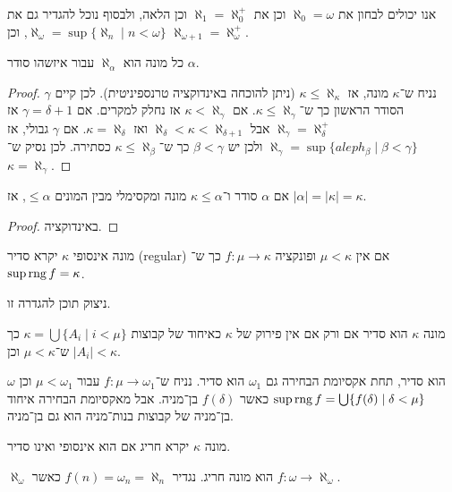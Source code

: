 אנו יכולים לבחון את $\aleph_0 = \omega$ וכן את $\aleph_1 = \aleph_0^+$ וכן הלאה, ולבסוף נוכל להגדיר גם את $\aleph_{\omega} = \sup\{ \aleph_n \mid n < \omega \}$, וכן $\aleph_{\omega + 1} = \aleph_{\omega}^+$.
\begin{theorem}
	כל מונה הוא $\aleph_{\alpha}$ עבור איזשהו סודר $\alpha$.
\end{theorem}
\begin{proof}
	נניח ש־$\kappa$ מונה, אז $\kappa \le \aleph_{\kappa}$ (ניתן להוכחה באינדוקציה טרנספיניטית).
	לכן קיים $\gamma$ הסודר הראשון כך ש־$\kappa \le \aleph_{\gamma}$.
	אם $\kappa < \aleph_{\gamma}$ אז נחלק למקרים.
	אם $\gamma = \delta + 1$ אז $\aleph_{\gamma} = \aleph_{\delta}^+$ אבל $\aleph_{\delta} < \kappa < \aleph_{\delta + 1}$ ואז $\kappa = \aleph_{\delta}$.
	אם $\gamma$ גבולי, אז $\aleph_{\gamma} = \sup\{ aleph_{\beta} \mid \beta < \gamma \}$ ולכן יש $\beta < \gamma$ כך ש־$\kappa \le \aleph_{\beta}$ כסתירה.
	לכן נסיק ש־$\kappa = \aleph_{\gamma}$.
\end{proof}
\begin{corollary}
	אם $\alpha$ סודר ו־$\kappa \le \alpha$ מונה ומקסימלי מבין המונים $\le \alpha$, אז $|\alpha| = |\kappa| = \kappa$.
\end{corollary}
\begin{proof}
	באינדוקציה.
\end{proof}
\begin{definition}
	מונה אינסופי $\kappa$ יקרא סדיר (regular) אם אין $\mu < \kappa$ ופונקציה $f : \mu \to \kappa$ כך ש־$\sup \operatorname{rng} f = \kappa$.
\end{definition}
ניצוק תוכן להגדרה זו.
\begin{proposition}
	מונה $\kappa$ הוא סדיר אם ורק אם אין פירוק של $\kappa$ כאיחוד של קבוצות $\kappa = \bigcup \{ A_i \mid i < \mu \}$ כך ש־$\mu < \kappa$ וכן $|A_i| < \kappa$.
\end{proposition}
\begin{example}
	$\omega$ הוא סדיר, תחת אקסיומת הבחירה גם $\omega_1$ הוא סדיר.
	נניח ש־$f : \mu \to \omega_1$ עבור $\mu < \omega_1$ וכן $\sup \operatorname{rng} f = \bigcup \{ f(\delta) \mid \delta < \mu \}$ כאשר $f(\delta)$ בן־מניה.
	אבל מאקסיומת הבחירה איחוד בן־מניה של קבוצות בנות־מניה הוא גם בן־מניה.
\end{example}
\begin{definition}
	מונה $\kappa$ יקרא חריג אם הוא אינסופי ואינו סדיר.
\end{definition}
\begin{example}
	$\aleph_{\omega}$ הוא מונה חריג.
	נגדיר $f(n) = \omega_n = \aleph_n$ כאשר $f : \omega \to \aleph_{\omega}$.
\end{example}
